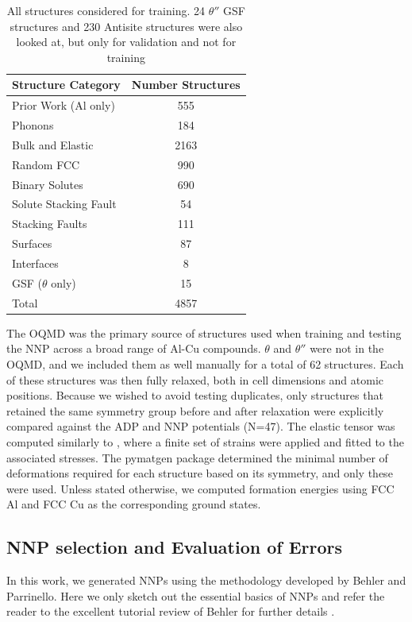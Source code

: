 \documentclass{article}
\begin{document}
\begin{table}[H]
\begin{tabular}{l|c}%
\hline%
Structure Category& Number Structures\\%
\hline%
Prior Work (Al only) &	555 \\
Phonons &	184 \\
Bulk and Elastic  &	2163 \\
Random FCC	& 990 \\
Binary Solutes & 	690 \\
Solute Stacking Fault &	54 \\
Stacking Faults &	111 \\
Surfaces &	87 \\
Interfaces &	8 \\
GSF ($\theta$ only)	 & 15 \\
\hline
Total &	4857 \\
\end{tabular}%
\caption{All structures considered for training. 24 $\theta''$ GSF structures and 230 Antisite structures were 
also looked at, but only for validation and not for training}
\label{table:included_structures}
\end{table}


The OQMD was the primary source of structures used when training and
testing the NNP across a broad range of Al-Cu compounds. $\theta$ and $\theta''$ were not in the OQMD, and we
included them as well manually for a total of 62 structures. Each of these structures was then fully relaxed, 
both in cell dimensions and atomic positions. Because we wished to avoid testing duplicates, only structures that retained the same symmetry group before and after relaxation were explicitly compared against the ADP and NNP
potentials (N=47). The elastic tensor was computed similarly to \cite{DeJong2015}, where a finite set of strains were
applied and fitted to the associated stresses. The pymatgen package\cite{Ong2013} determined the minimal number of
deformations required for each structure based on its symmetry, and only these were used. 
Unless stated otherwise, we computed formation energies using FCC Al and FCC Cu as the corresponding ground states. 

\subsection{NNP selection and Evaluation of Errors}
In this work, we generated NNPs using the methodology developed by Behler and Parrinello\cite{Behler2007}.
Here we only sketch out the essential basics of NNPs and refer the reader to the excellent tutorial review of Behler for further details \cite{Behler2015}. 
\end{document}
